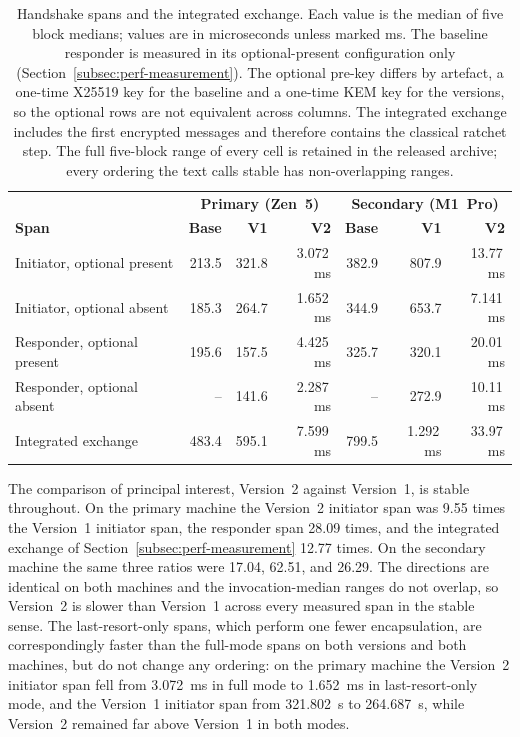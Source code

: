 \begin{table}[htbp]
\centering
\caption{Handshake spans and the integrated exchange. Each value is the median of five block medians; values are in microseconds unless marked ms. The baseline responder is measured in its optional-present configuration only (Section~\ref{subsec:perf-measurement}). The optional pre-key differs by artefact, a one-time X25519 key for the baseline and a one-time KEM key for the versions, so the optional rows are not equivalent across columns. The integrated exchange includes the first encrypted messages and therefore contains the classical ratchet step. The full five-block range of every cell is retained in the released archive; every ordering the text calls stable has non-overlapping ranges.}
\label{tab:handshake}
\small
\begin{tabular}{l rrr rrr}
\hline
 & \multicolumn{3}{c}{\textbf{Primary (Zen~5)}} & \multicolumn{3}{c}{\textbf{Secondary (M1~Pro)}} \\
\textbf{Span} & \textbf{Base} & \textbf{V1} & \textbf{V2} & \textbf{Base} & \textbf{V1} & \textbf{V2} \\
\hline
Initiator, optional present & 213.5 & 321.8 & 3.072\,ms & 382.9 & 807.9 & 13.77\,ms \\
Initiator, optional absent & 185.3 & 264.7 & 1.652\,ms & 344.9 & 653.7 & 7.141\,ms \\
Responder, optional present & 195.6 & 157.5 & 4.425\,ms & 325.7 & 320.1 & 20.01\,ms \\
Responder, optional absent & -- & 141.6 & 2.287\,ms & -- & 272.9 & 10.11\,ms \\
Integrated exchange & 483.4 & 595.1 & 7.599\,ms & 799.5 & 1.292\,ms & 33.97\,ms \\
\hline
\end{tabular}
\end{table}

The comparison of principal interest, Version~2 against Version~1, is stable throughout. On the primary machine the Version~2 initiator span was 9.55 times the Version~1 initiator span, the responder span 28.09 times, and the integrated exchange of Section~\ref{subsec:perf-measurement} 12.77 times. On the secondary machine the same three ratios were 17.04, 62.51, and 26.29. The directions are identical on both machines and the invocation-median ranges do not overlap, so Version~2 is slower than Version~1 across every measured span in the stable sense. The last-resort-only spans, which perform one fewer encapsulation, are correspondingly faster than the full-mode spans on both versions and both machines, but do not change any ordering: on the primary machine the Version~2 initiator span fell from 3.072~ms in full mode to 1.652~ms in last-resort-only mode, and the Version~1 initiator span from 321.802~\textmu s to 264.687~\textmu s, while Version~2 remained far above Version~1 in both modes.

